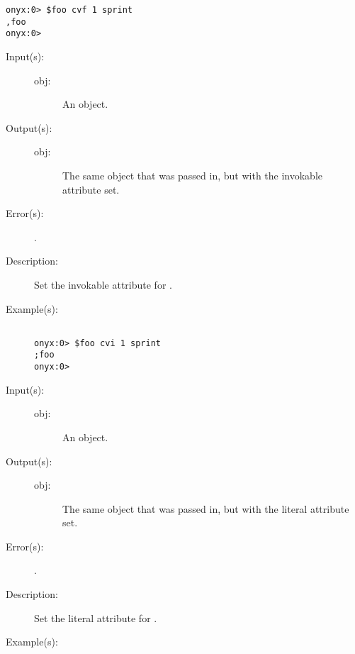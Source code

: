\begin{description}
\begin{description}
\begin{verbatim}
onyx:0> $foo cvf 1 sprint
,foo
onyx:0>
		\end{verbatim}
	\end{description}
\label{systemdict:cvi}
\item[{\onyxop{obj}{cvi}{obj}}: ]
	\begin{description}\item[]
	\item[Input(s): ]
		\begin{description}\item[]
		\item[obj: ]
			An object.
		\end{description}
	\item[Output(s): ]
		\begin{description}\item[]
		\item[obj: ]
			The same object that was passed in, but with the
			invokable attribute set.
		\end{description}
	\item[Error(s): ]
		\begin{description}\item[]
		\item[.]
		\end{description}
	\item[Description: ]
		Set the invokable attribute for .
	\item[Example(s): ]\begin{verbatim}

onyx:0> $foo cvi 1 sprint
;foo
onyx:0>
		\end{verbatim}
	\end{description}
\label{systemdict:cvl}
\item[{\onyxop{obj}{cvl}{obj}}: ]
	\begin{description}\item[]
	\item[Input(s): ]
		\begin{description}\item[]
		\item[obj: ]
			An object.
		\end{description}
	\item[Output(s): ]
		\begin{description}\item[]
		\item[obj: ]
			The same object that was passed in, but with the literal
			attribute set.
		\end{description}
	\item[Error(s): ]
		\begin{description}\item[]
		\item[.]
		\end{description}
	\item[Description: ]
		Set the literal attribute for .
	\item[Example(s): ]\begin{verbatim}


\end{verbatim}
\end{description}
\end{description}
